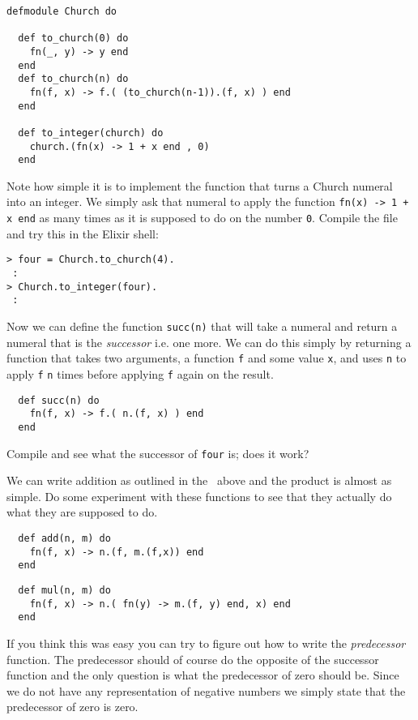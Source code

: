 \documentclass[a4paper,11pt]{article}
\begin{document}
\begin{verbatim}
defmodule Church do

  def to_church(0) do
    fn(_, y) -> y end
  end
  def to_church(n) do
    fn(f, x) -> f.( (to_church(n-1)).(f, x) ) end
  end

  def to_integer(church) do
    church.(fn(x) -> 1 + x end , 0)
  end
\end{verbatim}

Note how simple it is to implement the function that turns a Church
numeral into an integer. We simply ask that numeral to apply the
function {\tt fn(x) -> 1 + x end} as many times as it is supposed to
do on the number {\tt 0}. Compile the file and try this in the Elixir shell:

\begin{verbatim}
> four = Church.to_church(4).
 :
> Church.to_integer(four).
 :
\end{verbatim}

Now we can define the function {\tt succ(n)} that will take a numeral
and return a numeral that is the {\em successor} i.e. one more. We
can do this simply by returning a function that takes two arguments, a
function {\tt f} and some value {\tt x}, and uses {\tt n} to apply {\tt f}
{\tt n} times before applying {\tt f} again on the result. 

\begin{verbatim}
  def succ(n) do
    fn(f, x) -> f.( n.(f, x) ) end
  end
\end{verbatim}

Compile and see what the successor of {\tt four} is; does it work?

We can write addition as outlined in the \lame\ above and the product
is almost as simple. Do some experiment with these functions to see
that they actually do what they are supposed to do.

\begin{verbatim}
  def add(n, m) do
    fn(f, x) -> n.(f, m.(f,x)) end
  end
\end{verbatim}

\begin{verbatim}
  def mul(n, m) do
    fn(f, x) -> n.( fn(y) -> m.(f, y) end, x) end
  end
\end{verbatim}

If you think this was easy you can try to figure out how to write the
{\em predecessor} function. The predecessor should of course do the
opposite of the successor function and the only question is what the
predecessor of zero should be. Since we do not have any representation
of negative numbers we simply state that the predecessor of zero is
zero.
\end{document}
